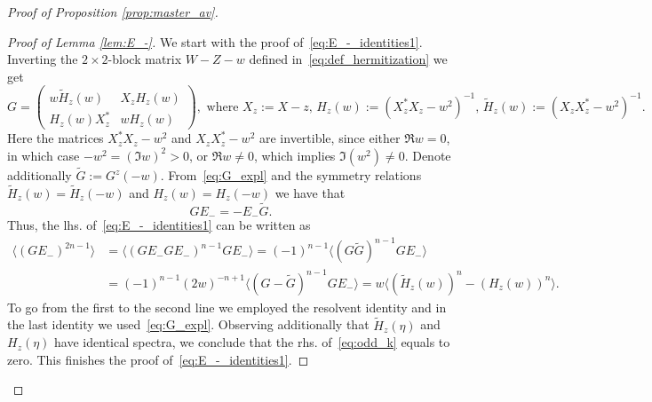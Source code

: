 \documentclass[10pt]{amsart}
\numberwithin{equation}{section}
\begin{document}
\begin{proof}[Proof of Proposition \ref{prop:master_av}]
\begin{proof}[Proof of Lemma \ref{lem:E_-}] We start with the proof of~\eqref{eq:E_-_identities1}. Inverting the $2\times 2$-block matrix $W-Z-w$ defined in~\eqref{eq:def_hermitization} we get
\begin{equation}
G\!=\!\begin{pmatrix}
w \widetilde{H}_z(w)& X_z H_z(w)\\ H_z(w)X_z^*& w H_z(w)
\end{pmatrix}\!\!,\,\, \text{where}\,\, X_z\!:=X-z,\,
H_z(w)\!:=\! (X_z^*X_z-w^2)^{-1}\!\!,\, \widetilde{H}_z(w)\!:=\! (X_zX_z^*-w^2)^{-1}\!\!.
\label{eq:G_expl}
\end{equation}
Here the matrices $X_z^*X_z-w^2$ and $X_zX_z^*-w^2$ are invertible, since either $\Re w=0$, in which case $-w^2=(\Im w)^2>0$, or $\Re w\neq 0$, which implies $\Im (w^2)\neq 0$. Denote additionally $\widetilde{G}:=G^z(-w)$. From~\eqref{eq:G_expl} and the symmetry relations $\widetilde{H}_z(w)=\widetilde{H}_z(-w)$ and $H_z(w)=H_z(-w)$ we have that
\begin{equation}
GE_-=-E_-\widetilde{G}.
\label{eq:GE}
\end{equation}
Thus, the lhs. of~\eqref{eq:E_-_identities1} can be written as
\begin{equation}
\begin{split}
\langle (GE_-)^{2n-1}\rangle &= \langle (GE_-GE_-)^{n-1} GE_-\rangle = (-1)^{n-1} \langle (G\widetilde{G})^{n-1} GE_-\rangle\\
& = (-1)^{n-1} (2w)^{-n+1}\langle (G-\widetilde{G})^{n-1} GE_-\rangle=w\langle (\widetilde{H}_z(w))^{n}-(H_z(w))^{n}\rangle.
\end{split}
\label{eq:odd_k}
\end{equation}
To go from the first to the second line we employed the resolvent identity and in the last identity we used~\eqref{eq:G_expl}. Observing additionally that $\widetilde{H}_z(\eta)$ and $H_z(\eta)$ have identical spectra, we conclude that the rhs. of~\eqref{eq:odd_k} equals to zero. This finishes the proof of~\eqref{eq:E_-_identities1}.


\end{proof}
\end{proof}
\end{document}
